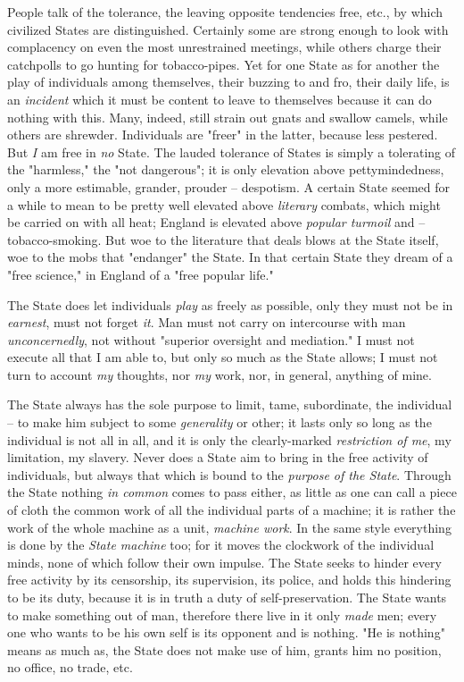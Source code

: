 \documentclass[a4paper]{book}
\begin{document}
People talk of the tolerance, the leaving opposite tendencies free, etc., by 
which civilized States are distinguished. Certainly some are strong enough to 
look with complacency on even the most unrestrained meetings, while others 
charge their catchpolls to go hunting for tobacco-pipes. Yet for one State as 
for another the play of individuals among themselves, their buzzing to and 
fro, their daily life, is an \textit{incident} which it must be content to 
leave to themselves because it can do nothing with this. Many, indeed, still 
strain out gnats and swallow camels, while others are shrewder. Individuals 
are "{}freer"{} in the latter, because less pestered. But \textit{I} am free 
in \textit{no} State. The lauded tolerance of States is simply a tolerating of 
the "{}harmless,"{} the "{}not dangerous"{}; it is only elevation above 
pettymindedness, only a more estimable, grander, prouder -- despotism. A 
certain State seemed for a while to mean to be pretty well elevated above 
\textit{literary} combats, which might be carried on with all heat; England is 
elevated above \textit{popular turmoil} and -- tobacco-smoking. But woe to the 
literature that deals blows at the State itself, woe to the mobs that 
"{}endanger"{} the State. In that certain State they dream of a "{}free 
science,"{} in England of a "{}free popular life."{}

The State does let individuals \textit{play} as freely as possible, only they 
must not be in \textit{earnest}, must not forget \textit{it}. Man must not 
carry on intercourse with man \textit{unconcernedly}, not without "{}superior 
oversight and mediation."{} I must not execute all that I am able to, but only 
so much as the State allows; I must not turn to account \textit{my} thoughts, 
nor \textit{my} work, nor, in general, anything of mine.

The State always has the sole purpose to limit, tame, subordinate, the 
individual -- to make him subject to some \textit{generality} or other; it 
lasts only so long as the individual is not all in all, and it is only the 
clearly-marked \textit{restriction of me}, my limitation, my slavery. Never 
does a State aim to bring in the free activity of individuals, but always that 
which is bound to the \textit{purpose of the State}. Through the State nothing 
\textit{in common} comes to pass either, as little as one can call a piece of 
cloth the common work of all the individual parts of a machine; it is rather 
the work of the whole machine as a unit, \textit{machine work}. In the same 
style everything is done by the \textit{State machine} too; for it moves the 
clockwork of the individual minds, none of which follow their own impulse. The 
State seeks to hinder every free activity by its censorship, its supervision, 
its police, and holds this hindering to be its duty, because it is in truth a 
duty of self-preservation. The State wants to make something out of man, 
therefore there live in it only \textit{made} men; every one who wants to be 
his own self is its opponent and is nothing. "{}He is nothing"{} means as much 
as, the State does not make use of him, grants him no position, no office, no 
trade, etc.
\end{document}
